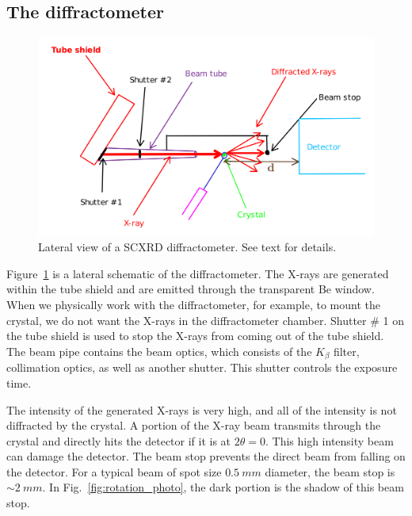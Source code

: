 \subsection{The diffractometer}

\begin{figure}
	\centering
	\includegraphics[scale=0.15]{sc_diffractometer_lateral.png}
	\caption{\label{diffractometer_lateral}Lateral view of a SCXRD diffractometer. See text for details.}
\end{figure}

Figure~\ref{diffractometer_lateral} is a lateral schematic of the diffractometer. The X-rays are generated within the tube shield and are emitted through the transparent Be window. When we physically work with the diffractometer, for example, to mount the crystal, we do not want the X-rays in the diffractometer chamber. Shutter \# 1 on the tube shield is used to stop the X-rays from coming out of the tube shield. The beam pipe contains the beam optics, which consists of the $K_\beta$ filter, collimation optics, as well as another shutter. This shutter controls the exposure time.

The intensity of the generated X-rays is very high, and all of the intensity is not diffracted by the crystal. A portion of the X-ray beam transmits through the crystal and directly hits the detector if it is at $2\theta = 0.$ This high intensity beam can damage the detector. The beam stop prevents the direct beam from falling on the detector. For a typical beam of spot size $\SI{0.5}{mm}$ diameter, the beam stop is $\sim \SI{2}{mm}.$ In Fig.~\ref{fig:rotation_photo}, the dark portion is the shadow of this beam stop.

